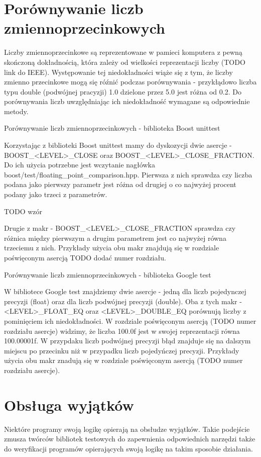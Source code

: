 \documentclass[12pt,a4paper,notitlepage]{report}
\begin{document}
\chapter{Porównywanie liczb zmiennoprzecinkowych}

Liczby zmiennoprzecinkowe są reprezentowane w pamieci komputera z pewną skończoną dokładnością, która zależy od wielkości reprezentacji liczby (TODO link do IEEE). Występowanie tej niedokładności wiąże się z tym, że liczby zmienno przecinkowe mogą się róźnić podczas porównywania - przykłądowo liczba typu double (podwójnej pracyzji) 1.0 dzielone przez 5.0 jest różna od 0.2.
Do porównywania liczb uwzględniając ich niedokładność wymagane są odpowiednie metody.

Porównywanie liczb zmiennoprzecinkowych - biblioteka Boost unittest

Korzystając z biblioteki Boost unittest mamy do dyskozycji dwie asercje - BOOST_<LEVEL>_CLOSE oraz BOOST_<LEVEL>_CLOSE_FRACTION. Do ich użycia potrzebne jest wczytanie nagłówka boost/test/floating_point_comparison.hpp.
Pierwsza z nich sprawdza czy liczba podana jako pierwszy parametr jest różna od drugiej o co najwyżej procent podany jako trzeci z parametrów.

TODO wzór

Drugie z makr - BOOST_<LEVEL>_CLOSE_FRACTION sprawdza czy różnica między pierwszym a drugim parametrem jest co najwyżej równa trzeciemu z nich.
Przykłady użycia obu makr znajdują się w rozdziale poświęconym asercją TODO dodać numer rozdziału.

Porównywanie liczb zmiennoprzecinkowych - biblioteka Google test

W bibliotece Google test znajdziemy dwie asercje - jedną dla liczb pojedynczej precyzji (float) oraz dla liczb podwójnej precyzji (double).
Oba z tych makr - <LEVEL>_FLOAT_EQ oraz <LEVEL>_DOUBLE_EQ porównują liczby z pominięciem ich niedokładności. W rozdziale poświęconym asercją (TODO numer rozdziału asercje) widzimy, że liczba 100.0f jest w swojej reprezentacji równa 100.00001f. W przypdaku liczb podwójnej precyzji błąd znajduje się na dalszym miejscu po przecinku niż w przypadku liczb pojedyńczej precyzji.
Przykłady użycia obu makr znadują się w rozdziale poświęconym asercją (TODO numer rozdziału asercje).

\chapter{Obsługa wyjątków}

Niektóre programy swoją logikę opierają na obsłudze wyjątków. Takie podejście zmusza twórców bibliotek testowych do zapewnienia odpowiednich narzędzi także do weryfikacji programów opierających swoją logikę na takim sposobie działania. 
\end{document}
